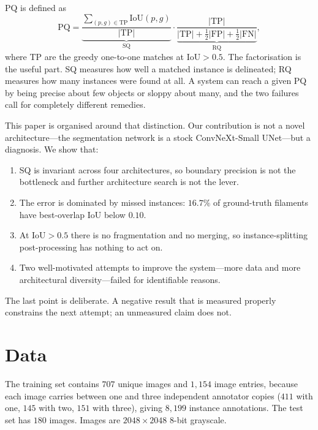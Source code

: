 \documentclass[conference]{IEEEtran}
\begin{document}
PQ is defined as
\begin{equation}
\mathrm{PQ} = \underbrace{\frac{\sum_{(p,g)\in \mathrm{TP}} \mathrm{IoU}(p,g)}{|\mathrm{TP}|}}_{\mathrm{SQ}}
\cdot
\underbrace{\frac{|\mathrm{TP}|}{|\mathrm{TP}| + \tfrac12|\mathrm{FP}| + \tfrac12|\mathrm{FN}|}}_{\mathrm{RQ}},
\label{eq:pq}
\end{equation}
where TP are the greedy one-to-one matches at $\mathrm{IoU} > 0.5$. The
factorisation is the useful part. SQ measures how well a matched instance is
delineated; RQ measures how many instances were found at all. A system can reach
a given PQ by being precise about few objects or sloppy about many, and the two
failures call for completely different remedies.

This paper is organised around that distinction. Our contribution is not a novel
architecture---the segmentation network is a stock ConvNeXt-Small UNet---but a
diagnosis. We show that:

\begin{enumerate}
\item SQ is invariant across four architectures, so boundary precision is not
  the bottleneck and further architecture search is not the lever.
\item The error is dominated by missed instances: $16.7\%$ of ground-truth
  filaments have best-overlap IoU below $0.10$.
\item At $\mathrm{IoU}>0.5$ there is no fragmentation and no merging, so
  instance-splitting post-processing has nothing to act on.
\item Two well-motivated attempts to improve the system---more data and more
  architectural diversity---failed for identifiable reasons.
\end{enumerate}

The last point is deliberate. A negative result that is measured properly
constrains the next attempt; an unmeasured claim does not.

\section{Data}

The training set contains $707$ unique images and $1{,}154$ image entries,
because each image carries between one and three independent annotator copies
($411$ with one, $145$ with two, $151$ with three), giving $8{,}199$ instance
annotations. The test set has $180$ images. Images are $2048\times2048$ 8-bit
grayscale.
\end{document}
